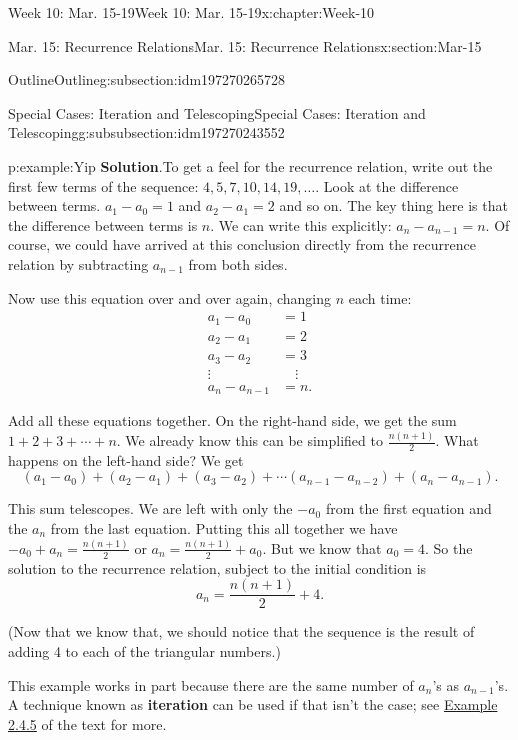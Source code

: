 \documentclass[oneside,10pt,]{book}
\newcommand{\blocktitlefont}{\relax}
\newcommand{\terminology}[1]{\textbf{#1}}
\numberwithin{equation}{section}
\newcommand{\amp}{&}
\begin{document}
\begin{chapterptx}{Week 10: Mar. 15-19}{}{Week 10: Mar. 15-19}{}{}{x:chapter:Week-10}
\begin{sectionptx}{Mar. 15: Recurrence Relations}{}{Mar. 15: Recurrence Relations}{}{}{x:section:Mar-15}
\begin{subsectionptx}{Outline}{}{Outline}{}{}{g:subsection:idm197270265728}
\begin{subsubsectionptx}{Special Cases: Iteration and Telescoping}{}{Special Cases: Iteration and Telescoping}{}{}{g:subsubsection:idm197270243552}
\begin{example}{}{p:example:Yip}
\noindent\textbf{\blocktitlefont Solution}.\hypertarget{p:solution:pgA}{}\quad{}To get a feel for the recurrence relation, write out the first few terms of the sequence: \(4, 5, 7, 10, 14, 19, \ldots\). Look at the difference between terms. \(a_1 - a_0 = 1\) and \(a_2 - a_1 = 2\) and so on. The key thing here is that the difference between terms is \(n\). We can write this explicitly: \(a_n - a_{n-1} = n\). Of course, we could have arrived at this conclusion directly from the recurrence relation by subtracting \(a_{n-1}\) from both sides.%
\par
Now use this equation over and over again, changing \(n\) each time:%
\begin{align*}
a_1 - a_0 \amp = 1\\
a_2 - a_1 \amp = 2\\
a_3 - a_2 \amp = 3\\
\vdots \quad \amp \quad \vdots\\
a_n - a_{n-1} \amp = n\text{.}
\end{align*}
%
\par
Add all these equations together. On the right-hand side, we get the sum \(1 + 2 + 3 + \cdots + n\). We already know this can be simplified to \(\frac{n(n+1)}{2}\). What happens on the left-hand side? We get%
\begin{equation*}
(a_1 - a_0) + (a_2 - a_1) + (a_3 - a_2) + \cdots (a_{n-1} - a_{n-2})+ (a_n - a_{n-1})\text{.}
\end{equation*}
%
\par
This sum telescopes. We are left with only the \(-a_0\) from the first equation and the \(a_n\) from the last equation. Putting this all together we have \(-a_0 + a_n = \frac{n(n+1)}{2}\) or \(a_n = \frac{n(n+1)}{2} + a_0\). But we know that \(a_0 = 4\). So the solution to the recurrence relation, subject to the initial condition is%
\begin{equation*}
a_n = \frac{n(n+1)}{2} + 4\text{.}
\end{equation*}
%
\par
(Now that we know that, we should notice that the sequence is the result of adding 4 to each of the triangular numbers.) %
\end{example}
This example works in part because there are the same number of \(a_n\)'s as \(a_{n-1}\)'s. A technique known as \terminology{iteration} can be used if that isn't the case; see \href{http://discrete.openmathbooks.org/dmoi3/sec_recurrence.html\#kwH}{Example 2.4.5} of the text for more.%
\end{subsubsectionptx}

\end{subsectionptx}
\end{sectionptx}
\end{chapterptx}
\end{document}
